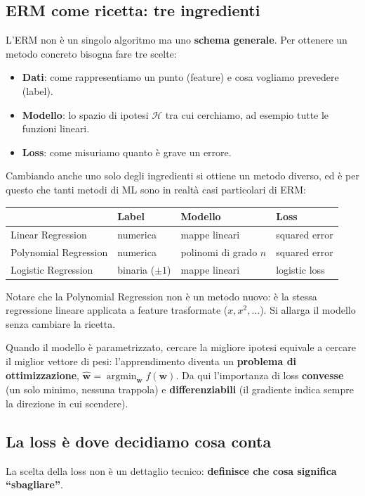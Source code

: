 \subsection*{ERM come ricetta: tre ingredienti}
L'ERM non è un singolo algoritmo ma uno \textbf{schema generale}. Per ottenere un metodo concreto bisogna fare tre scelte:
\begin{itemize}
    \item \textbf{Dati}: come rappresentiamo un punto (feature) e cosa vogliamo prevedere (label).
    \item \textbf{Modello}: lo spazio di ipotesi $\mathcal{H}$ tra cui cerchiamo, ad esempio tutte le funzioni lineari.
    \item \textbf{Loss}: come misuriamo quanto è grave un errore.
\end{itemize}

Cambiando anche uno solo degli ingredienti si ottiene un metodo diverso, ed è per questo che tanti metodi di ML sono in realtà casi particolari di ERM:

\begin{center}
    \begin{tabular}{l|l|l|l}
        & \textbf{Label} & \textbf{Modello} & \textbf{Loss} \\ \hline
        Linear Regression & numerica & mappe lineari & squared error \\
        Polynomial Regression & numerica & polinomi di grado $n$ & squared error \\
        Logistic Regression & binaria ($\pm 1$) & mappe lineari & logistic loss \\
    \end{tabular}
\end{center}

Notare che la Polynomial Regression non è un metodo nuovo: è la stessa regressione lineare applicata a feature trasformate ($x, x^2, \dots$). Si allarga il modello senza cambiare la ricetta.

Quando il modello è parametrizzato, cercare la migliore ipotesi equivale a cercare il miglior vettore di pesi: l'apprendimento diventa un \textbf{problema di ottimizzazione}, $\widehat{\mathbf{w}} = \operatorname{argmin}_{\mathbf{w}} f(\mathbf{w})$. Da qui l'importanza di loss \textbf{convesse} (un solo minimo, nessuna trappola) e \textbf{differenziabili} (il gradiente indica sempre la direzione in cui scendere).

\subsection*{La loss è dove decidiamo cosa conta}
La scelta della loss non è un dettaglio tecnico: \textbf{definisce che cosa significa ``sbagliare''}.

